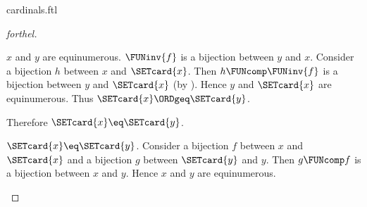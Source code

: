 \documentclass{naproche-library}
\begin{document}
\begin{smodule}[title=Cardinal Numbers]{cardinals.ftl}
\begin{proof}[forthel]
\begin{case}{$x$ and $y$ are equinumerous.}
    $\FUNinv{f}$ is a bijection between $y$ and $x$.
    Consider a bijection $h$ between $x$ and $\SETcard{x}$.
    Then $h \FUNcomp \FUNinv{f}$ is a bijection between $y$ and $\SETcard{x}$ (by ).
    Hence $y$ and $\SETcard{x}$ are equinumerous.
    Thus $\SETcard{x} \ORDgeq \SETcard{y}$.

    Therefore $\SETcard{x} \eq \SETcard{y}$.
  \end{case}

  \begin{case}{$\SETcard{x} \eq \SETcard{y}$.}
    Consider a bijection $f$ between $x$ and $\SETcard{x}$ and a bijection $g$
    between $\SETcard{y}$ and $y$.
    Then $g \FUNcomp f$ is a bijection between $x$ and $y$.
    Hence $x$ and $y$ are equinumerous.
  \end{case}
\end{proof}
\end{smodule}
\end{document}
